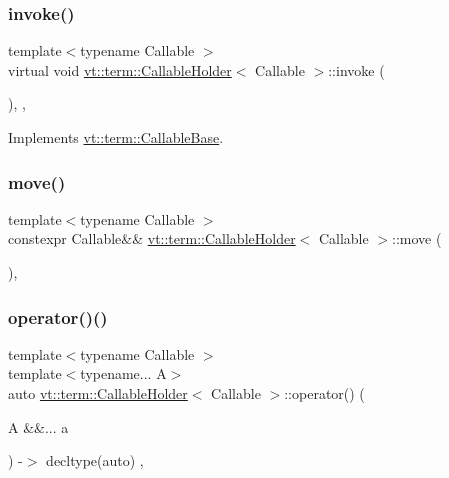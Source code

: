 \subsubsection{\texorpdfstring{invoke()}{invoke()}}
{\footnotesize\ttfamily template$<$typename Callable $>$ \\
virtual void \hyperlink{structvt_1_1term_1_1_callable_holder}{vt\+::term\+::\+Callable\+Holder}$<$ Callable $>$\+::invoke (\begin{DoxyParamCaption}{ }\end{DoxyParamCaption})\hspace{0.3cm}{\ttfamily [inline]}, {\ttfamily [override]}, {\ttfamily [virtual]}}



Implements \hyperlink{structvt_1_1term_1_1_callable_base_a534f470aaf4dd168faa9adf3c91e6ca2}{vt\+::term\+::\+Callable\+Base}.

\mbox{\label{structvt_1_1term_1_1_callable_holder_a9a1517406276e39c5a5c140196ea7ccf}} 
\subsubsection{\texorpdfstring{move()}{move()}}
{\footnotesize\ttfamily template$<$typename Callable $>$ \\
constexpr Callable\&\& \hyperlink{structvt_1_1term_1_1_callable_holder}{vt\+::term\+::\+Callable\+Holder}$<$ Callable $>$\+::move (\begin{DoxyParamCaption}{ }\end{DoxyParamCaption})\hspace{0.3cm}{\ttfamily [inline]}, {\ttfamily [protected]}}

\mbox{\label{structvt_1_1term_1_1_callable_holder_a4cf06b82cc1a80a9070f77de9841957f}} 
\subsubsection{\texorpdfstring{operator()()}{operator()()}}
{\footnotesize\ttfamily template$<$typename Callable $>$ \\
template$<$typename... A$>$ \\
auto \hyperlink{structvt_1_1term_1_1_callable_holder}{vt\+::term\+::\+Callable\+Holder}$<$ Callable $>$\+::operator() (\begin{DoxyParamCaption}\item[{A \&\&...}]{a }\end{DoxyParamCaption}) -\/$>$ decltype(auto) \hspace{0.3cm}{\ttfamily [inline]}, {\ttfamily [protected]}}



